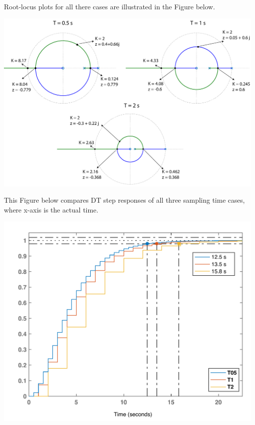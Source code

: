 \documentclass[twoside]{article}
\begin{document}
Root-locus plots for all there cases are illustrated in the Figure
below.

\begin{center}
\begin{minipage}[h]{\linewidth}
    \begin{center}
      \includegraphics[width=\textwidth]{rlocus}
    \end{center}
\end{minipage}
\end{center}

This Figure below compares DT step responses of
all three sampling time cases, where x-axis is the actual 
time. 

\begin{center}
\begin{minipage}[h]{\linewidth}
    \begin{center}
      \includegraphics[width=\textwidth]{stepComp}
    \end{center}
\end{minipage}
\end{center}
\end{document}
